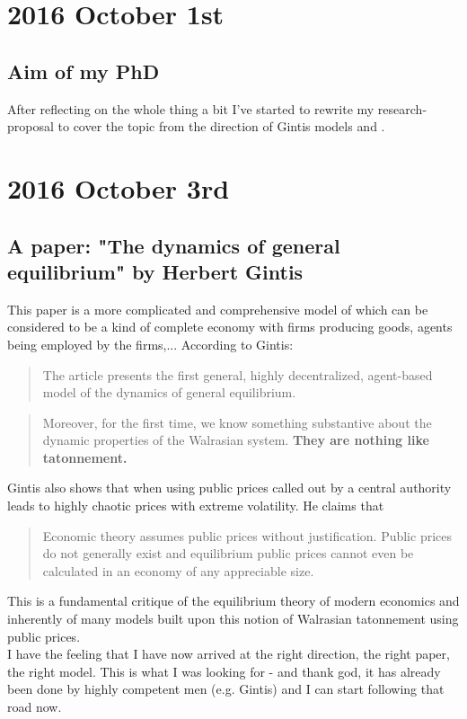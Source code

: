 \section*{2016 October 1st}
\subsection*{Aim of my PhD}
After reflecting on the whole thing a bit I've started to rewrite my research-proposal to cover the topic from the direction of Gintis models \cite{Gintis2006} and \cite{Botta20114025}.

\section*{2016 October 3rd}

\subsection*{A paper: "The dynamics of general equilibrium" by Herbert Gintis \cite{gintis_dynamics_2007}}
This paper is a more complicated and comprehensive model of \cite{Gintis2006} which can be considered to be a kind of complete economy with firms producing goods, agents being employed by the firms,... According to Gintis:

\begin{quote}
The article presents the first general, highly decentralized, agent-based model of the dynamics of general equilibrium.
\end{quote}

\begin{quote}
Moreover, for the first time, we know something substantive about the dynamic properties of the Walrasian system. \textbf{They are nothing like tatonnement.}
\end{quote}

Gintis also shows that when using public prices called out by a central authority leads to highly chaotic prices with extreme volatility. He claims that

\begin{quote}
Economic theory assumes public prices without justification. Public prices do not generally exist and equilibrium public prices cannot even be calculated in an economy of any appreciable size.
\end{quote}

This is a fundamental critique of the equilibrium theory of modern economics and inherently of many models built upon this notion of Walrasian tatonnement using public prices. \\
I have the feeling that I have now arrived at the right direction, the right paper, the right model. This is what I was looking for - and thank god, it has already been done by highly competent men (e.g. Gintis) and I can start following that road now.

